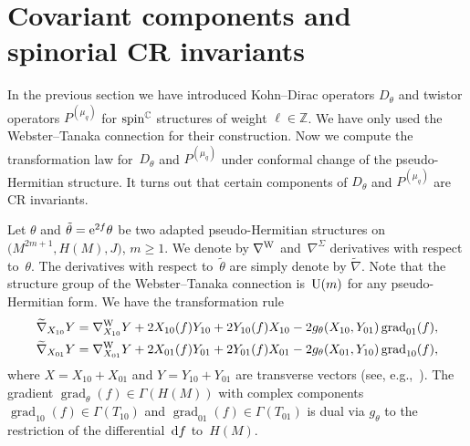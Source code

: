 \documentclass[10pt,a4paper]{amsart}
\numberwithin{equation}{section}
\newcommand{\ZZ}{\mathbb{Z}}
\newcommand{\CC}{\mathbb{C}}
\begin{document}
\section{Covariant components and spinorial CR invariants} \label{Sec7}

In the previous section we have introduced Kohn--Dirac operators $D_\theta$ and twistor operators $P^{(\mu_q)}$ for
${\rm spin}^\CC$ structures of weight $\ell\in\ZZ$. We have only used the Webster--Tanaka connection for their construction.
Now we compute the transformation law for~$D_\theta$ and $P^{(\mu_q)}$ under conformal change of the pseudo-Hermitian structure.
It turns out that certain components of $D_\theta$ and $P^{(\mu_q)}$ are CR invariants.

Let $\theta$ and $\tilde{\theta}= {\rm e}^{2f}\theta$ be two adapted pseudo-Hermitian structures on $\big(M^{2m+1},H(M),J\big)$, $m\geq 1$.
We denote by $\nabla^{\rm W}$ and~$\nabla^\Sigma$ derivatives with respect to~$\theta$.
The derivatives with respect to~$\tilde{\theta}$ are simply denote by $\widetilde{\nabla}$.
Note that the structure group of the Webster--Tanaka connection is~${\rm U}(m)$ for any pseudo-Hermitian form.
We have the transformation rule
\begin{gather}
\widetilde{\nabla}_{X_{10}}Y = \nabla^{\rm W}_{X_{10}}Y + 2X_{10}(f)Y_{10} + 2Y_{10}(f)X_{10} - 2g_\theta(X_{10},Y_{01})\operatorname{grad}_{01}(f),\nonumber\\
\widetilde{\nabla}_{X_{01}}Y = \nabla^{\rm W}_{X_{01}}Y + 2X_{01}(f)Y_{01} + 2Y_{01}(f)X_{01}- 2g_\theta(X_{01},Y_{10})\operatorname{grad}_{10}(f),\label{traflaw1}
\end{gather}
where $X=X_{10}+X_{01}$ and $Y=Y_{10}+Y_{01}$ are transverse vectors (see, e.g.,~\cite{Lee}). The gradient $\operatorname{grad}_\theta(f)\in \Gamma(H(M))$ with complex components
 $\operatorname{grad}_{10}(f)\in\Gamma(T_{10})$ and $\operatorname{grad}_{01}(f)\in\Gamma(T_{01})$
is dual via $g_\theta$ to the restriction of the differential~${\rm d}f$ to~$H(M)$.
\end{document}
